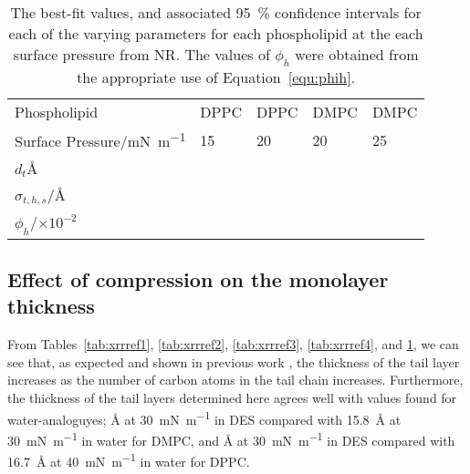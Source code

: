 \begin{table}
    \centering
    \small
    \caption{The best-fit values, and associated \SI{95}{\percent} confidence intervals for each of the varying parameters for each phospholipid at the each surface pressure from NR. The values of $\phi_h$ were obtained from the appropriate use of Equation~\ref{equ:phih}.}
    \label{tab:nrref}
    \begin{tabular}{l | l l l l}
        \toprule
        Phospholipid & DPPC & DPPC & DMPC & DMPC \\
        Surface Pressure/\si{\milli\newton\per\meter} & 15 & 20 & 20 & 25 \\
        \midrule
        $d_t$\si{\angstrom} &  &  &  &  \\
        $\sigma_{t,h,s}$/\si{\angstrom} &  &  &  &  \\
        \midrule
        $\phi_h$/$\times 10^{-2}$ &  &  &  &  \\
        \bottomrule
    \end{tabular}
\end{table}
%

\subsection{Effect of compression on the monolayer thickness}
From Tables~\ref{tab:xrrref1}, \ref{tab:xrrref2}, \ref{tab:xrrref3}, \ref{tab:xrrref4}, and \ref{tab:nrref}, we can see that, as expected and shown in previous work \cite{mohwald_phospholipid_1990,vaknin_structural_1991}, the thickness of the tail layer increases as the number of carbon atoms in the tail chain increases.
Furthermore, the thickness of the tail layers determined here agrees well with values found for water-analoguyes; \si{\angstrom} at \SI{30}{\milli\newton\per\meter} in DES compared with \SI{15.8}{\angstrom} at \SI{30}{\milli\newton\per\meter} in water for DMPC, and \si{\angstrom} at \SI{30}{\milli\newton\per\meter} in DES compared with \SI{16.7}{\angstrom} at \SI{40}{\milli\newton\per\meter} in water for DPPC.

